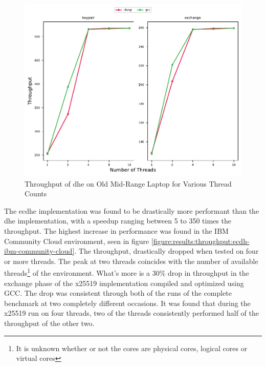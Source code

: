 \begin{figure}
    \centering
    \includegraphics[scale=0.75]{chapters/results/throughput/Old Mid-Range Laptop_dh.pdf}
    \caption{Throughput of \gls{dhe} on Old Mid-Range Laptop for Various Thread Counts}
    \label{figure:results:throughput:dh-old-mid-range-laptop}
\end{figure}

The \gls{ecdhe} implementation was found to be drastically more performant than the \gls{dhe} implementation, with a speedup ranging between 5 to 350 times the throughput. The highest increase in performance was found in the IBM Community Cloud environment, seen in figure \ref{figure:results:throughput:ecdh-ibm-community-cloud}. The throughput, drastically dropped when tested on four or more threads. The peak at two threads coincides with the number of available threads\footnote{It is unknown whether or not the cores are physical cores, logical cores or virtual cores} of the environment. What's more is a 30\% drop in throughput in the exchange phase of the \gls{x25519} implementation compiled and optimized using GCC. The drop was consistent through both of the runs of the complete benchmark at two completely different occasions. It was found that during the \gls{x25519} run on four threads, two of the threads consistently performed half of the throughput of the other two.


